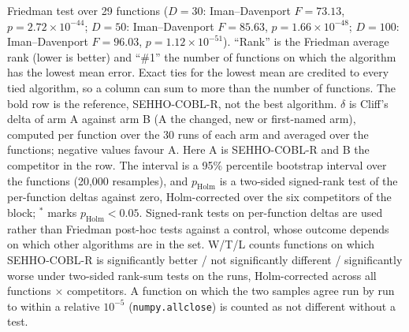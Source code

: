 \begin{table}[htbp]
{\begin{tabular}{lccccccccccccccc}
\bottomrule
\end{tabular}}
\begin{flushleft}\footnotesize
Friedman test over 29 functions ($D=30$: Iman--Davenport $F=73.13$, $p=2.72\times10^{-44}$; $D=50$: Iman--Davenport $F=85.63$, $p=1.66\times10^{-48}$; $D=100$: Iman--Davenport $F=96.03$, $p=1.12\times10^{-51}$). ``Rank'' is the Friedman average rank (lower is better) and ``\#1'' the number of functions on which the algorithm has the lowest mean error. Exact ties for the lowest mean are credited to every tied algorithm, so a column can sum to more than the number of functions. The bold row is the reference, SEHHO-COBL-R, not the best algorithm. $\delta$ is Cliff's delta of arm A against arm B (A the changed, new or first-named arm), computed per function over the 30 runs of each arm and averaged over the functions; negative values favour A. Here A is SEHHO-COBL-R and B the competitor in the row. The interval is a 95\% percentile bootstrap interval over the functions (20{,}000 resamples), and $p_{\text{Holm}}$ is a two-sided signed-rank test of the per-function deltas against zero, Holm-corrected over the six competitors of the block; $^{*}$ marks $p_{\text{Holm}}<0.05$. Signed-rank tests on per-function deltas are used rather than Friedman post-hoc tests against a control, whose outcome depends on which other algorithms are in the set. W/T/L counts functions on which SEHHO-COBL-R is significantly better / not significantly different / significantly worse under two-sided rank-sum tests on the runs, Holm-corrected across all functions $\times$ competitors. A function on which the two samples agree run by run to within a relative $10^{-5}$ (\texttt{numpy.allclose}) is counted as not different without a test.
\end{flushleft}
\end{table}
